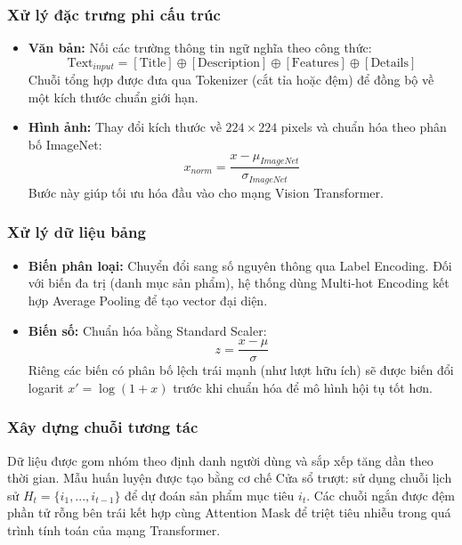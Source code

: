 \subsubsection{Xử lý đặc trưng phi cấu trúc}
\begin{itemize}
    \item \textbf{Văn bản:} Nối các trường thông tin ngữ nghĩa theo công thức:
    \begin{equation}
        \text{Text}_{input} = [\text{Title}] \oplus [\text{Description}] \oplus [\text{Features}] \oplus [\text{Details}]
    \end{equation}
    Chuỗi tổng hợp được đưa qua Tokenizer (cắt tỉa hoặc đệm) để đồng bộ về một kích thước chuẩn giới hạn.
    \item \textbf{Hình ảnh:} Thay đổi kích thước về $224 \times 224$ pixels và chuẩn hóa theo phân bố ImageNet:
    \begin{equation}
        x_{norm} = \frac{x - \mu_{ImageNet}}{\sigma_{ImageNet}}
    \end{equation}
    Bước này giúp tối ưu hóa đầu vào cho mạng Vision Transformer.
\end{itemize}

\subsubsection{Xử lý dữ liệu bảng}
\begin{itemize}
    \item \textbf{Biến phân loại:} Chuyển đổi sang số nguyên thông qua Label Encoding. Đối với biến đa trị (danh mục sản phẩm), hệ thống dùng Multi-hot Encoding kết hợp Average Pooling để tạo vector đại diện.
    \item \textbf{Biến số:} Chuẩn hóa bằng Standard Scaler:
    \begin{equation}
        z = \frac{x - \mu}{\sigma}
    \end{equation}
    Riêng các biến có phân bố lệch trái mạnh (như lượt hữu ích) sẽ được biến đổi logarit $x' = \log(1 + x)$ trước khi chuẩn hóa để mô hình hội tụ tốt hơn.
\end{itemize}

\subsubsection{Xây dựng chuỗi tương tác}
Dữ liệu được gom nhóm theo định danh người dùng và sắp xếp tăng dần theo thời gian. Mẫu huấn luyện được tạo bằng cơ chế Cửa sổ trượt: sử dụng chuỗi lịch sử $H_t = \{i_1, ..., i_{t-1}\}$ để dự đoán sản phẩm mục tiêu $i_t$. Các chuỗi ngắn được đệm phần tử rỗng bên trái kết hợp cùng Attention Mask để triệt tiêu nhiễu trong quá trình tính toán của mạng Transformer.

